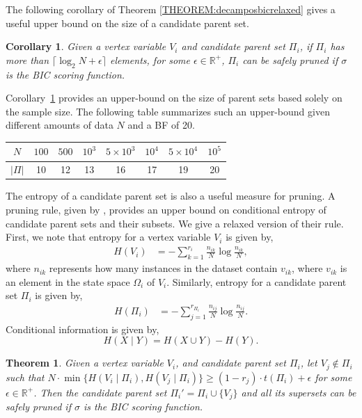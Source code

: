 \documentclass[letterpaper]{article}
\newcommand{\vertex}[1]{V_{#1}}
\newcommand{\parents}{\Pi}
\newcommand{\ceil}[1]{\lceil #1 \rceil}
\newtheorem{theorem}{Theorem}
\newtheorem{corollary}{Corollary}
\begin{document}
The following corollary of Theorem \ref{THEOREM:decamposbicrelaxed} gives a useful upper bound on the size of a candidate parent set.





\begin{corollary}
Given a vertex variable $\vertex{i}$ and candidate parent set
$\Pi_i$, if $\Pi_i$ has more than $\ceil{\log_2 N + \epsilon}$ elements, for some $\epsilon \in \mathbb{R}^+$, $\Pi_i$ can be safely pruned if $\sigma$ is the BIC scoring function. \label{cor:decampossizerelaxed}
\end{corollary}

Corollary~\ref{cor:decampossizerelaxed} provides an upper-bound on the size of parent sets based solely on the sample size. The following table summarizes such an upper-bound given different amounts of data $N$ and a BF of 20.
\begin{table}[ht]
\centering
\begin{tabular}{@{}c||ccccccc@{}}
$N$ & $100$ & $500$ & $10^{3}$ & $5\times10^{3}$ & $10^{4}$ & $5\times10^{4}$ & $10^{5}$ \\\hline
$|\parents|$ & 10 & 12 & 13 & 16 & 17 & 19 & 20
\end{tabular}
\label{tab:paLim}
\end{table}

The entropy of a candidate parent set is also a useful measure for pruning. A pruning rule, given by \cite{Campos2017}, provides an upper bound on conditional entropy of candidate parent sets and their subsets. We give a relaxed version of their rule. First, we note that entropy for a vertex variable $\vertex{i}$ is given by,
\begin{align*}
H(\vertex{i}) &=  -\sum^{r_i}_{k=1}\frac{n_{ik}}{N}\log \frac{n_{ik}}{N} ,
\end{align*}
where $n_{ik}$ represents how many instances in the dataset contain $v_{ik}$, where $v_{ik}$ is an element in the state space $\Omega_i$ of $\vertex{i}$. Similarly, entropy for a candidate parent set $\Pi_i$ is given by,
\begin{align*}
H(\Pi_i) &=  -\sum^{r_{\Pi_i}}_{j=1}\frac{n_{ij}}{N}\log \frac{n_{ij}}{N} .
\end{align*}
Conditional information is given by,
\begin{equation*}
H(X \mid Y ) = H(X \cup Y) - H(Y) .
\end{equation*}




\begin{theorem}
Given a vertex variable $V_i$, and candidate parent set $\Pi_i$, let $V_j \notin \Pi_i$  such that $N \cdot \min \{H(V_i \mid \Pi_i), H(V_j \mid \Pi_i)\} \geq (1 - r_{j}) \cdot t(\Pi_i) +\epsilon$ for some $\epsilon \in \mathbb{R}^+$. Then the candidate parent set $\Pi_i' = \Pi_i \cup \{V_j \}$ and all its supersets can be safely pruned if $\sigma$ is the BIC scoring function.
\end{theorem}
\end{document}
